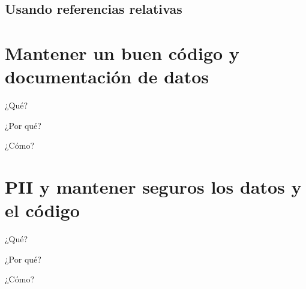 \documentclass[11pt,en]{elegantpaper}
\begin{document}
\subsection{Usando referencias relativas}

\section{Mantener un buen código y documentación de datos}
¿Qué?


¿Por qué? 


¿Cómo? 
\section{PII y mantener seguros los datos y el código}
¿Qué?


¿Por qué? 


¿Cómo? 
\end{document}
